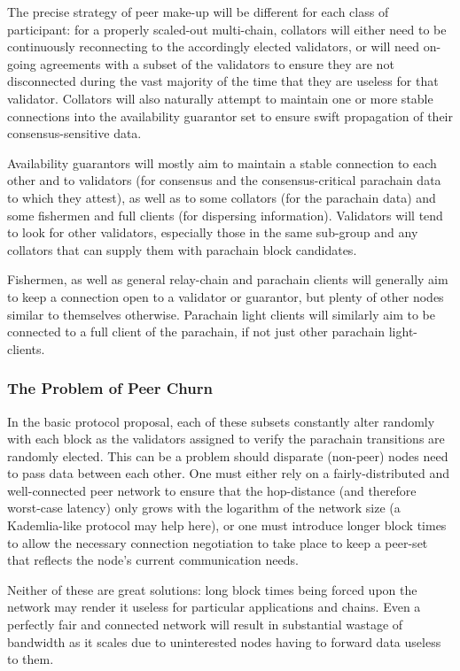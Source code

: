 \documentclass[9pt,oneside]{amsart}
\begin{document}
\begin{multicols}{2}
 The precise strategy of peer make-up will be different for each class of participant: for a properly scaled-out multi-chain, collators will either need to be continuously reconnecting to the accordingly elected validators, or will need on-going agreements with a subset of the validators to ensure they are not disconnected during the vast majority of the time that they are useless for that validator. Collators will also naturally attempt to maintain one or more stable connections into the availability guarantor set to ensure swift propagation of their consensus-sensitive data.

 Availability guarantors will mostly aim to maintain a stable connection to each other and to validators (for consensus and the consensus-critical parachain data to which they attest), as well as to some collators (for the parachain data) and some fishermen and full clients (for dispersing information). Validators will tend to look for other validators, especially those in the same sub-group and any collators that can supply them with parachain block candidates.

 Fishermen, as well as general relay-chain and parachain clients will generally aim to keep a connection open to a validator or guarantor, but plenty of other nodes similar to themselves otherwise. Parachain light clients will similarly aim to be connected to a full client of the parachain, if not just other parachain light-clients.

\subsubsection{The Problem of Peer Churn}
\label{the-problem-of-peer-churn}

 In the basic protocol proposal, each of these subsets constantly alter randomly with each block as the validators assigned to verify the parachain transitions are randomly elected. This can be a problem should disparate (non-peer) nodes need to pass data between each other. One must either rely on a fairly-distributed and well-connected peer network to ensure that the hop-distance (and therefore worst-case latency) only grows with the logarithm of the network size (a Kademlia-like protocol may help here), or one must introduce longer block times to allow the necessary connection negotiation to take place to keep a peer-set that reflects the node's current communication needs.

 Neither of these are great solutions: long block times being forced upon the network may render it useless for particular applications and chains. Even a perfectly fair and connected network will result in substantial wastage of bandwidth as it scales due to uninterested nodes having to forward data useless to them.


\end{multicols}
\end{document}

